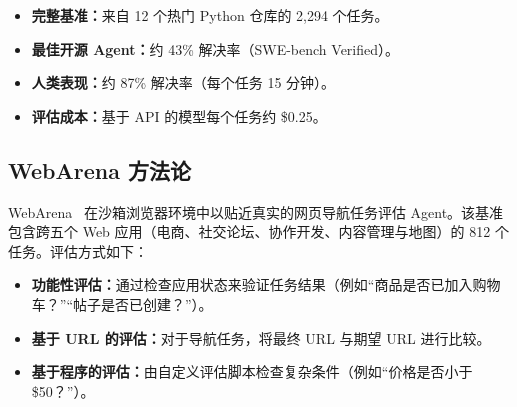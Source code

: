 \begin{keybox}
\begin{itemize}
  \item \textbf{完整基准：}来自 12 个热门 Python 仓库的 2,294 个任务。
  \item \textbf{最佳开源 Agent：}约 43\% 解决率（SWE-bench Verified）。
  \item \textbf{人类表现：}约 87\% 解决率（每个任务 15 分钟）。
  \item \textbf{评估成本：}基于 API 的模型每个任务约 \$0.25。
\end{itemize}
\end{keybox}

\subsection{WebArena 方法论}
\label{webarena-methodology}

WebArena~\cite{zhou2024webarena} 在沙箱浏览器环境中以贴近真实的网页导航任务评估 Agent。该基准包含跨五个 Web 应用（电商、社交论坛、协作开发、内容管理与地图）的 812 个任务。评估方式如下：

\begin{itemize}
  \item \textbf{功能性评估：}通过检查应用状态来验证任务结果（例如“商品是否已加入购物车？”“帖子是否已创建？”）。
  \item \textbf{基于 URL 的评估：}对于导航任务，将最终 URL 与期望 URL 进行比较。
  \item \textbf{基于程序的评估：}由自定义评估脚本检查复杂条件（例如“价格是否小于 \$50？”）。
\end{itemize}

